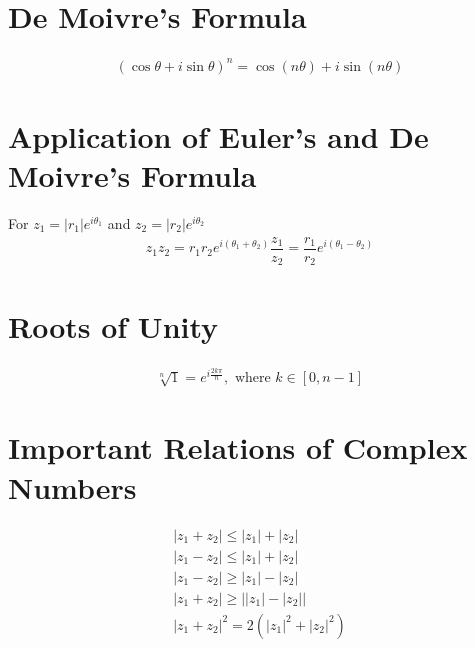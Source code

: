 \section{De Moivre's Formula}
\begin{align}
	(\cos\theta+i\sin\theta)^n=\cos (n\theta)+i\sin(n\theta)
\end{align}


\section{Application of Euler's and De Moivre's Formula}
For $z_1=\lvert r_1 \rvert e^{i\theta_1}$ and $z_2=\lvert r_2 \rvert e^{i\theta_2}$
\begin{align}
	z_1z_2=r_1r_2e^{i(\theta_1+\theta_2)}
	\dfrac{z_1}{z_2}=\dfrac{r_1}{r_2}e^{i(\theta_1-\theta_2)}
\end{align}


\section{Roots of Unity}
\begin{align}
	\sqrt[n]{1}=e^{i\frac{2k\pi}{n}},\text{ where } k \in [0,n-1]
\end{align}


\section{Important Relations of Complex Numbers}
\begin{align}
	\lvert z_1+z_2\rvert \leq \lvert z_1 \rvert+\lvert z_2\rvert\\
	\lvert z_1-z_2\rvert \leq \lvert z_1 \rvert+\lvert z_2\rvert\\
	\lvert z_1-z_2\rvert \geq \lvert z_1 \rvert-\lvert z_2\rvert\\
	\lvert z_1+z_2\rvert \geq \lvert \lvert z_1 \rvert-\lvert z_2\rvert\rvert\\
	\lvert z_1+z_2 \rvert^2=2(\lvert z_1 \rvert^2+\lvert z_2 \rvert^2)
\end{align}
